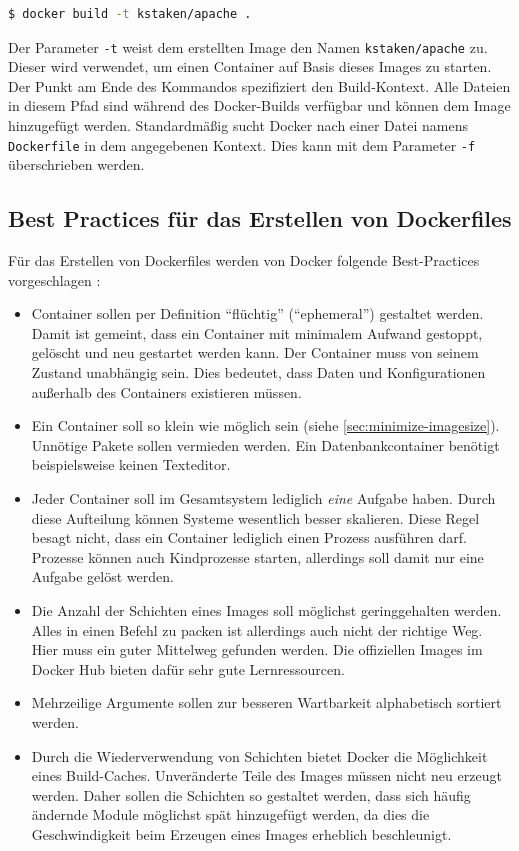 \begin{lstlisting}[caption=Erstellen eines Images auf Basis eines Dockerfiles, language=bash, label=lst:dockerfile-build]
$ docker build -t kstaken/apache .
\end{lstlisting}
Der Parameter \texttt{-t} weist dem erstellten Image den Namen \texttt{kstaken/apache} zu.
Dieser wird verwendet, um einen Container auf Basis dieses Images zu starten.
Der Punkt am Ende des Kommandos spezifiziert den Build-Kontext.
Alle Dateien in diesem Pfad sind während des Docker-Builds verfügbar und können dem Image hinzugefügt werden.
Standardmäßig sucht Docker nach einer Datei namens \texttt{Dockerfile} in dem angegebenen Kontext.
Dies kann mit dem Parameter \texttt{-f} überschrieben werden.

\subsection{Best Practices für das Erstellen von Dockerfiles}
\label{sec:dockerfile-best-practices}
Für das Erstellen von Dockerfiles werden von Docker folgende Best-Practices vorgeschlagen \autocite{docker-dockerfile-best-practices:online}:
\begin{itemize}
    \item Container sollen per Definition "`flüchtig"' ("`ephemeral"') gestaltet werden. Damit ist gemeint, dass ein Container mit minimalem Aufwand gestoppt, gelöscht und neu gestartet werden kann. Der Container muss von seinem Zustand unabhängig sein. Dies bedeutet, dass Daten und Konfigurationen außerhalb des Containers existieren müssen.
    \item Ein Container soll so klein wie möglich sein (siehe \cref{sec:minimize-imagesize}). Unnötige Pakete sollen vermieden werden. Ein Datenbankcontainer benötigt beispielsweise keinen Texteditor.
    \item Jeder Container soll im Gesamtsystem lediglich \emph{eine} Aufgabe haben. Durch diese Aufteilung können Systeme wesentlich besser skalieren. Diese Regel besagt nicht, dass ein Container lediglich einen Prozess ausführen darf. Prozesse können auch Kindprozesse starten, allerdings soll damit nur eine Aufgabe gelöst werden.
    \item Die Anzahl der Schichten eines Images soll möglichst geringgehalten werden. Alles in einen Befehl zu packen ist allerdings auch nicht der richtige Weg. Hier muss ein guter Mittelweg gefunden werden. Die offiziellen Images im Docker Hub bieten dafür sehr gute Lernressourcen.
    \item Mehrzeilige Argumente sollen zur besseren Wartbarkeit alphabetisch sortiert werden.
    \item Durch die Wiederverwendung von Schichten bietet Docker die Möglichkeit eines Build-Caches. Unveränderte Teile des Images müssen nicht neu erzeugt werden. Daher sollen die Schichten so gestaltet werden, dass sich häufig ändernde Module möglichst spät hinzugefügt werden, da dies die Geschwindigkeit beim Erzeugen eines Images erheblich beschleunigt.
\end{itemize}

